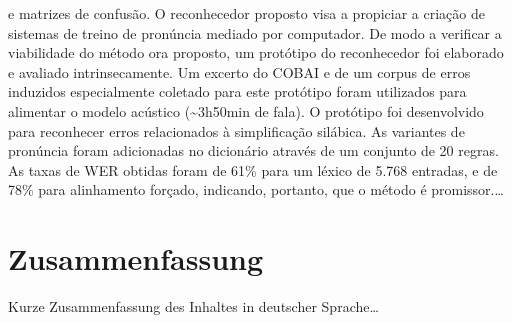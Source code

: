 e matrizes de confus\~ao. O reconhecedor proposto visa a propiciar a
cria\c{c}\~ao de sistemas de treino de pron\'uncia mediado por computador. De
modo a verificar a viabilidade do m\'etodo ora proposto, um prot\'otipo do
reconhecedor foi elaborado e avaliado intrinsecamente. Um excerto do
COBAI e de um corpus de erros induzidos especialmente coletado para este
prot\'otipo foram utilizados para alimentar o modelo ac\'ustico
(\textasciitilde{}3h50min de fala). O prot\'otipo foi desenvolvido para
reconhecer erros relacionados à simplifica\c{c}\~ao sil\'abica. As variantes de
pron\'uncia foram adicionadas no dicion\'ario atrav\'es de um conjunto de 20
regras. As taxas de WER obtidas foram de 61\% para um l\'exico de 5.768
entradas, e de 78\% para alinhamento for\c{c}ado, indicando, portanto, que o
m\'etodo \'e promissor.\dots


\vfill

\chapter*{Zusammenfassung}
Kurze Zusammenfassung des Inhaltes in deutscher Sprache\dots


\endgroup			

\vfill